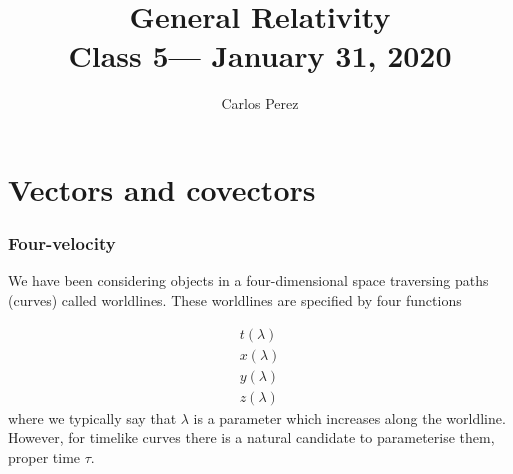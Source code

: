 \documentclass[11pt]{article}
\title{{\Huge General Relativity}\\{\Large{Class 5--- January 31, 2020}}} %
\author{Carlos Perez}
\theoremstyle{plain}
\begin{document}
    \maketitle
    \flushbottom
    \newpage
    \pagestyle{fancynotes}
    \part{Vectors and covectors}


\section{Four-velocity}

We have been considering objects in a four-dimensional space traversing paths (curves) called worldlines. These worldlines are specified by four functions 

\begin{align*}
t(\lambda)	\\
x(\lambda)	\\
y(\lambda)	\\
z(\lambda)	
\end{align*}
where we typically say that $\lambda$ is a parameter which increases along the worldline. However, for timelike curves there is a natural candidate to parameterise them, proper time $\tau$. 

\end{document}
